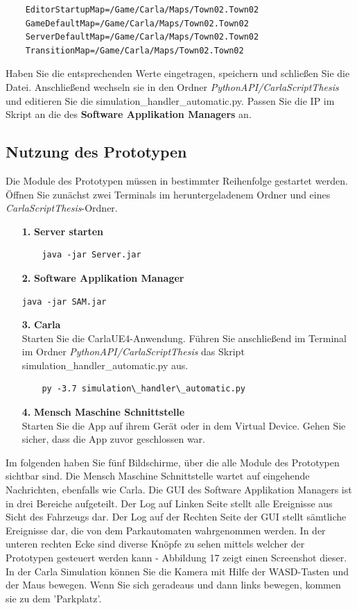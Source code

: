 \begin{itemize}
	\begin{verbatim}
	EditorStartupMap=/Game/Carla/Maps/Town02.Town02
	GameDefaultMap=/Game/Carla/Maps/Town02.Town02
	ServerDefaultMap=/Game/Carla/Maps/Town02.Town02
	TransitionMap=/Game/Carla/Maps/Town02.Town02
	\end{verbatim}	
	Haben Sie die entsprechenden Werte eingetragen, speichern und schließen Sie die Datei. Anschließend wechseln sie in den Ordner \textit{PythonAPI/CarlaScriptThesis} und editieren Sie die simulation\_handler\_automatic.py. Passen Sie die IP im Skript an die des \textbf{Software Applikation Managers} an. 
\end{itemize}

\subsection{Nutzung des Prototypen}
Die Module des Prototypen müssen in bestimmter Reihenfolge gestartet werden. Öffnen Sie  zunächst zwei Terminals im heruntergeladenem Ordner und eines \textit{CarlaScriptThesis}-Ordner.
\begin{itemize}
	\item[\textbf{1.}]\textbf{Server starten}
	\begin{verbatim}
	java -jar Server.jar
	\end{verbatim}
	\item[\textbf{2.}]\textbf{Software Applikation Manager}\begin{verbatim}java -jar SAM.jar\end{verbatim}
	\item[\textbf{3.}]\textbf{Carla\\}
	Starten Sie die CarlaUE4-Anwendung. Führen Sie anschließend im Terminal im Ordner \textit{\glqq PythonAPI/CarlaScriptThesis\grqq} das Skript  simulation\_handler\_automatic.py aus.
	\begin{verbatim}
	py -3.7 simulation\_handler\_automatic.py
	\end{verbatim} 
	\item[\textbf{4.}]\textbf{Mensch Maschine Schnittstelle}\\
	Starten Sie die App auf ihrem Gerät oder in dem Virtual Device. Gehen Sie sicher, dass die App zuvor geschlossen war.
\end{itemize}
Im folgenden haben Sie fünf Bildschirme, über die alle Module des Prototypen sichtbar sind. Die Mensch Maschine Schnittstelle wartet auf eingehende Nachrichten, ebenfalls wie Carla. Die GUI des Software Applikation Managers ist in drei Bereiche aufgeteilt. Der Log auf Linken Seite stellt alle Ereignisse aus Sicht des Fahrzeugs dar. Der Log auf der Rechten Seite der GUI stellt sämtliche Ereignisse dar, die von dem Parkautomaten wahrgenommen werden. In der unteren rechten Ecke sind diverse Knöpfe zu sehen mittels welcher der Prototypen gesteuert werden kann - Abbildung 17 zeigt einen Screenshot dieser. In der Carla Simulation können Sie die Kamera mit Hilfe der WASD-Tasten und der Maus bewegen. Wenn Sie sich geradeaus und dann links bewegen, kommen sie zu dem 'Parkplatz'.
